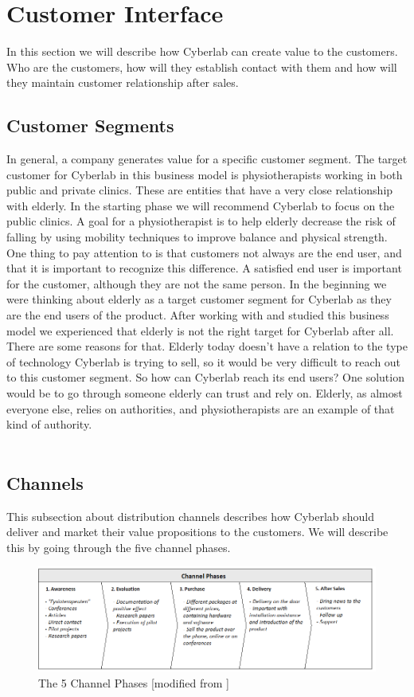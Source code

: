 \section{Customer Interface}
In this section we will describe how Cyberlab can create value to the customers. Who are the customers, how will they establish contact with them and how will they maintain customer relationship after sales.
\subsection{Customer Segments}
In general, a company generates value for a specific customer segment. The target customer for Cyberlab in this business model is physiotherapists working in both public and private clinics.  These are entities that have a very close relationship with elderly. In the starting phase we will recommend Cyberlab to focus on the public clinics. A goal for a physiotherapist is to help elderly decrease the risk of falling by using mobility techniques to improve balance and physical strength. One thing to pay attention to is that customers not always are the end user, and that it is important to recognize this difference. A satisfied end user is important for the customer, although they are not the same person. In the beginning we were thinking about elderly as a target customer segment for Cyberlab as they are the end users of the product. After working with and studied this business model we experienced that elderly is not the right target for Cyberlab after all. There are some reasons for that. Elderly today doesn’t have a relation to the type of technology Cyberlab is trying to sell, so it would be very difficult to reach out to this customer segment. So how can Cyberlab reach its end users?  One solution would be to go through someone elderly can trust and rely on. Elderly, as almost everyone else, relies on authorities, and physiotherapists are an example of that kind of authority. \\ \\ 
\subsection{Channels}
This subsection about distribution channels describes how Cyberlab should deliver and market their value propositions to the customers. We will describe this by going through the five channel phases.
\begin{figure}
\label{fig:Channels}
\begin{center}
\includegraphics[angle=90,scale=0.7]{channels}
\caption[Channels]{The 5 Channel Phases [modified from \cite{osterwalder}\cite{osterwalderthesis}]}
\end{center}
\end{figure}

